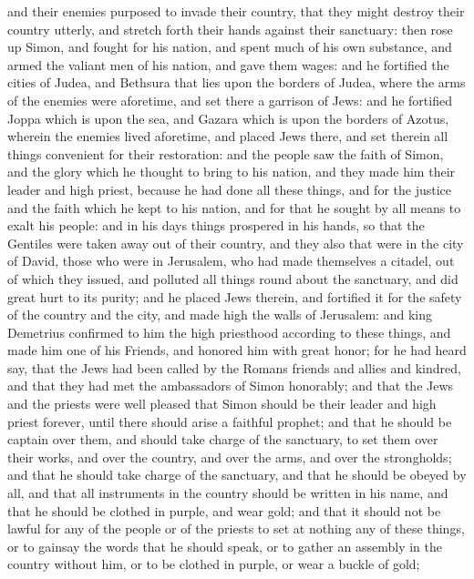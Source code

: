 {and their enemies purposed to invade their country, that they might destroy their country utterly, and stretch forth their hands against their sanctuary:
then rose up Simon, and fought for his nation, and spent much of his own substance, and armed the valiant men of his nation, and gave them wages:
and he fortified the cities of Judea, and Bethsura that lies upon the borders of Judea, where the arms of the enemies were aforetime, and set there a garrison of Jews:
and he fortified Joppa which is upon the sea, and Gazara which is upon the borders of Azotus, wherein the enemies lived aforetime, and placed Jews there, and set therein all things convenient for their restoration:
and the people saw the
 faith of Simon, and the glory which he thought to bring to his nation, and they made him their leader and high priest, because he had done all these things, and for the justice and the faith which he kept to his nation, and for that he sought by all means to exalt his people:
and in his days things prospered in his hands, so that the Gentiles were taken away out of their country, and they also that were in the city of David, those who were in Jerusalem, who had made themselves a citadel, out of which they issued, and polluted all things round about the sanctuary, and did great hurt to its purity;
and he placed Jews therein, and fortified it for the safety of the country and the city, and made high the walls of Jerusalem:
and king Demetrius confirmed to him the high priesthood according to these things,
and made him one of his
 Friends, and honored him with great honor;
for he had heard say, that the Jews had been called by the Romans friends and allies and kindred, and that they had met the ambassadors of Simon honorably;
and that the Jews and the priests were well pleased that Simon should be their leader and high priest forever, until there should arise a faithful prophet;
and that he should be captain over them, and should take charge of the sanctuary, to set them over their works, and over the country, and over the arms, and over the strongholds; and that he should take charge of the sanctuary,
and that he should be obeyed by all, and that all instruments in the country should be written in his name, and that he should be clothed in purple, and wear gold;
and that it should not be lawful for any of the people or of the priests to set at nothing any of these things, or to gainsay the words that he should speak, or to gather an assembly in the country without him, or to be clothed in purple, or wear a buckle of gold;
}
